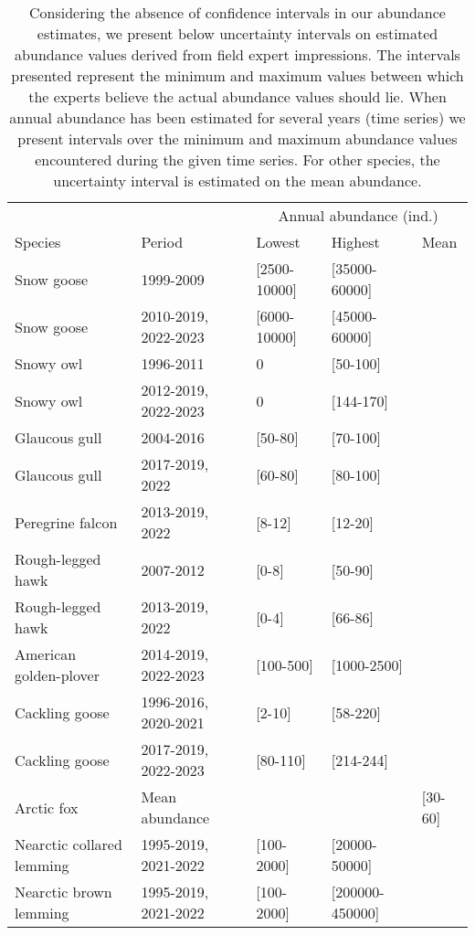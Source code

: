 \begin{table}[ht]
\centering
\caption{Considering the absence of confidence intervals in our abundance estimates, we present below uncertainty intervals on estimated abundance values derived from field expert impressions. The intervals presented represent the minimum and maximum values between which the experts believe the actual abundance values should lie. When annual abundance has been estimated for several years (time series) we present intervals over the minimum and maximum abundance values encountered during the given time series. For other species, the uncertainty interval is estimated on the mean abundance.} 
\begingroup\fontsize{10pt}{8pt}\selectfont
\begin{tabularx}{\textwidth}{lllll}
  \hline
  & &\multicolumn{3}{c}{Annual abundance (ind.)} \\
 Species & Period & Lowest & Highest & Mean \\
 \hline
Snow goose & 1999-2009 & [2500-10000] & [35000-60000] &  \\ 
  Snow goose & 2010-2019, 2022-2023 & [6000-10000] & [45000-60000] &  \\ 
  Snowy owl & 1996-2011 & 0 & [50-100] &  \\ 
  Snowy owl & 2012-2019, 2022-2023 & 0 & [144-170] &  \\ 
  Glaucous gull & 2004-2016 & [50-80] & [70-100] &  \\ 
  Glaucous gull & 2017-2019, 2022 & [60-80] & [80-100] &  \\ 
  Peregrine falcon & 2013-2019, 2022 & [8-12] & [12-20] &  \\ 
  Rough-legged hawk & 2007-2012 & [0-8] & [50-90] &  \\ 
  Rough-legged hawk & 2013-2019, 2022 & [0-4] & [66-86] &  \\ 
  American golden-plover & 2014-2019, 2022-2023 & [100-500] & [1000-2500] &  \\ 
  Cackling goose & 1996-2016, 2020-2021 & [2-10] & [58-220] &  \\ 
  Cackling goose & 2017-2019, 2022-2023 & [80-110] & [214-244] &  \\ 
  Arctic fox & Mean abundance &  &  & [30-60] \\ 
  Nearctic collared lemming & 1995-2019, 2021-2022 & [100-2000] & [20000-50000] &  \\ 
  Nearctic brown lemming & 1995-2019, 2021-2022 & [100-2000] & [200000-450000] &  \\ 

\end{tabularx}
\end{table}

